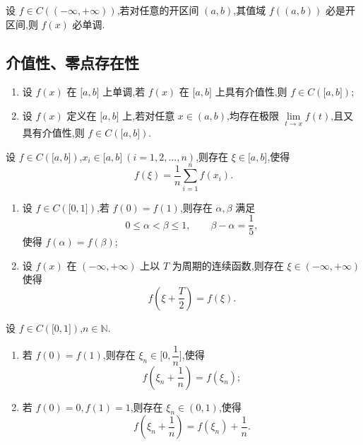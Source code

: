 \documentclass[../数学分析培优讲义.tex]{subfiles}
\begin{document}
\begin{example}
设 $f\in C(( -\infty,+\infty))$,若对任意的开区间 $(a,b)$,其值域 $f((a,b))$ 必是开区间,则 $f(x)$ 必单调.
\end{example}
\exampleblank


\newpage

\subsection{介值性、零点存在性}

\begin{example}
\begin{enumerate}[label=(\arabic*)]
    \item 设 $f(x)$ 在 $\lbrack a,b\rbrack$ 上单调,若 $f(x)$ 在 $\lbrack a,b\rbrack$ 上具有介值性,则 $f\in C(\lbrack a,b\rbrack)$;
    \item 设 $f(x)$ 定义在 $\lbrack a,b\rbrack$ 上,若对任意 $x\in(a,b)$,均存在极限 $\displaystyle\lim\limits_{t\to x}f(t)$,且又具有介值性,则 $f\in C(\lbrack a,b\rbrack)$.
\end{enumerate}
\end{example}
\exampleblank

\begin{example}
设 $f\in C(\lbrack a,b\rbrack)$,$x_i\in\lbrack a,b\rbrack\ (i=1,2,\ldots,n)$,则存在 $\xi\in\lbrack a,b\rbrack$,使得
\[
    f(\xi)=\dfrac{1}{n}\sum\limits_{i=1}^n f(x_i).
\]
\end{example}
\exampleblank

\begin{example}
\begin{enumerate}[label=(\arabic*)]
    \item 设 $f\in C(\lbrack 0,1\rbrack)$,若 $f(0)=f(1)$,则存在 $\alpha,\beta$ 满足
    \[
        0\leq\alpha<\beta\leq1,
        \qquad \beta-\alpha=\dfrac{1}{5},
    \]
    使得 $f(\alpha)=f(\beta)$;
    \item 设 $f(x)$ 在 $(-\infty,+\infty)$ 上以 $T$ 为周期的连续函数,则存在 $\xi\in(-\infty,+\infty)$ 使得
    \[
        f\left(\xi+\dfrac{T}{2}\right)=f(\xi).
    \]
\end{enumerate}
\end{example}
\exampleblank

\begin{example}
设 $f\in C(\lbrack 0,1\rbrack)$,$n\in\mathbb{N}$.
\begin{enumerate}[label=(\arabic*)]
    \item 若 $f(0)=f(1)$,则存在 $\xi_n\in\lbrack 0,\dfrac{1}{n}\rbrack$,使得
    \[
        f\left(\xi_n+\dfrac{1}{n}\right)=f(\xi_n);
    \]
    \item 若 $f(0)=0,f(1)=1$,则存在 $\xi_n\in(0,1)$,使得
    \[
        f\left(\xi_n+\dfrac{1}{n}\right)=f(\xi_n)+\dfrac{1}{n}.
    \]
\end{enumerate}
\end{example}
\exampleblank
\end{document}
